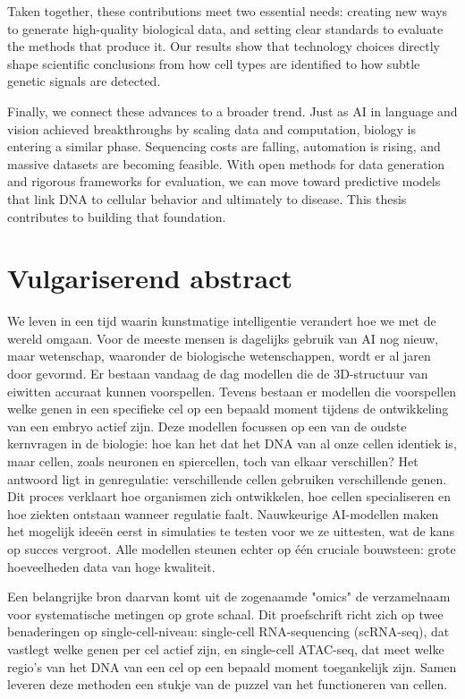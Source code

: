 Taken together, these contributions meet two essential needs: creating new ways to generate high-quality biological data, and setting clear standards to evaluate the methods that produce it. Our results show that technology choices directly shape scientific conclusions from how cell types are identified to how subtle genetic signals are detected.

Finally, we connect these advances to a broader trend. Just as AI in language and vision achieved breakthroughs by scaling data and computation, biology is entering a similar phase. Sequencing costs are falling, automation is rising, and massive datasets are becoming feasible. With open methods for data generation and rigorous frameworks for evaluation, we can move toward predictive models that link DNA to cellular behavior and ultimately to disease. This thesis contributes to building that foundation.

\chapter*{Vulgariserend abstract}

We leven in een tijd waarin kunstmatige intelligentie verandert hoe we met de wereld omgaan. Voor de meeste mensen is dagelijks gebruik van AI nog nieuw, maar wetenschap, waaronder de biologische wetenschappen, wordt er al jaren door gevormd. Er bestaan vandaag de dag modellen die de 3D-structuur van eiwitten accuraat kunnen voorspellen. Tevens bestaan er modellen die voorspellen welke genen in een specifieke cel op een bepaald moment tijdens de ontwikkeling van een embryo actief zijn. Deze modellen focussen op een van de oudste kernvragen in de biologie: hoe kan het dat het DNA van al onze cellen identiek is, maar cellen, zoals neuronen en spiercellen, toch van elkaar verschillen? Het antwoord ligt in genregulatie: verschillende cellen gebruiken verschillende genen. Dit proces verklaart hoe organismen zich ontwikkelen, hoe cellen specialiseren en hoe ziekten ontstaan wanneer regulatie faalt. Nauwkeurige AI-modellen maken het mogelijk ideeën eerst in simulaties te testen voor we ze uittesten, wat de kans op succes vergroot. Alle modellen steunen echter op één cruciale bouwsteen: grote hoeveelheden data van hoge kwaliteit.

Een belangrijke bron daarvan komt uit de zogenaamde "omics"\llap{,} de verzamelnaam voor systematische metingen op grote schaal. Dit proefschrift richt zich op twee benaderingen op single-cell-niveau: single-cell RNA-sequencing (scRNA-seq), dat vastlegt welke genen per cel actief zijn, en single-cell ATAC-seq, dat meet welke regio's van het DNA van een cel op een bepaald moment toegankelijk zijn. Samen leveren deze methoden een stukje van de puzzel van het functioneren van cellen.

